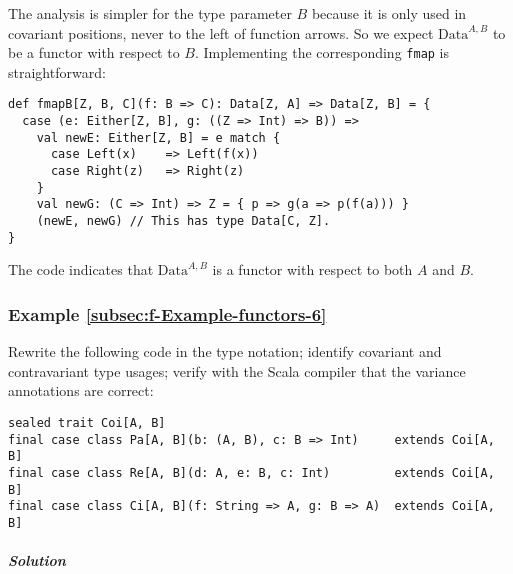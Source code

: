 The analysis is simpler for the type parameter $B$ because it is
only used in covariant positions, never to the left of function arrows.
So we expect $\text{Data}^{A,B}$ to be a functor with respect to
$B$. Implementing the corresponding \lstinline!fmap! is straightforward:
\begin{lstlisting}
def fmapB[Z, B, C](f: B => C): Data[Z, A] => Data[Z, B] = {
  case (e: Either[Z, B], g: ((Z => Int) => B)) =>
    val newE: Either[Z, B] = e match {
      case Left(x)    => Left(f(x))
      case Right(z)   => Right(z)
    }
    val newG: (C => Int) => Z = { p => g(a => p(f(a))) }
    (newE, newG) // This has type Data[C, Z].
}
\end{lstlisting}

The code indicates that $\text{Data}^{A,B}$ is a functor with respect
to both $A$ and $B$.

\subsubsection{Example \label{subsec:f-Example-functors-6}\ref{subsec:f-Example-functors-6}}

Rewrite the following code in the type notation; identify covariant
and contravariant type usages; verify with the Scala compiler that
the variance annotations are correct:
\begin{lstlisting}
sealed trait Coi[A, B]
final case class Pa[A, B](b: (A, B), c: B => Int)     extends Coi[A, B]
final case class Re[A, B](d: A, e: B, c: Int)         extends Coi[A, B]
final case class Ci[A, B](f: String => A, g: B => A)  extends Coi[A, B]
\end{lstlisting}


\subparagraph{Solution}

